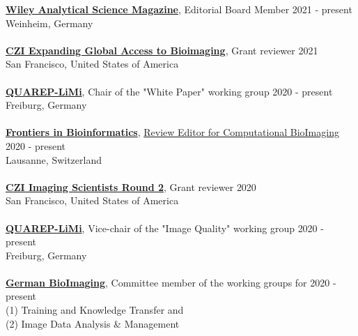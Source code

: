 \documentclass[margin,line]{res}
\begin{document}
\begin{resume}
{\bf \href{https://analyticalscience.wiley.com/}{Wiley Analytical Science Magazine}}, Editorial Board Member  \hfill {2021 - present}\\
Weinheim, Germany \\
\vspace*{-3mm}\\
{\bf \href{https://chanzuckerberg.com/rfa/expanding-global-access-bioimaging/}{CZI Expanding Global Access to Bioimaging}}, Grant reviewer \hfill {2021}\\
San Francisco, United States of America\\
\vspace*{-3mm}\\
{\bf \href{https://quarep.org/}{QUAREP-LiMi}}, Chair of the "White Paper" working group \hfill {2020 - present}\\
Freiburg, Germany\\
\vspace*{-3mm}\\
{\bf  \href{https://www.frontiersin.org/journals/bioinformatics/sections/computational-bioimaging}{ Frontiers in Bioinformatics}},  \href{https://www.frontiersin.org/journals/bioinformatics/sections/computational-bioimaging}{Review Editor for Computational BioImaging} \hfill {2020 - present}\\
Lausanne, Switzerland\\
\vspace*{-3mm}\\
{\bf \href{https://chanzuckerberg.com/rfa/chan-zuckerberg-initiative-imaging-scientists/}{CZI Imaging Scientists Round 2}}, Grant reviewer \hfill {2020}\\
San Francisco, United States of America\\
\vspace*{-3mm}\\
{\bf \href{https://quarep.org/}{QUAREP-LiMi}}, Vice-chair of the "Image Quality" working group  \hfill {2020 - present}\\
Freiburg, Germany\\
\vspace*{-3mm}\\
{\bf \href{https://www.gerbi-gmb.de/}{German BioImaging}}, Committee member of the working groups for \hfill {2020 - present}\\
 (1)  Training and Knowledge Transfer and\\
(2) Image Data Analysis \& Management\\
\vspace*{-3mm}\\

\end{resume}
\end{document}
